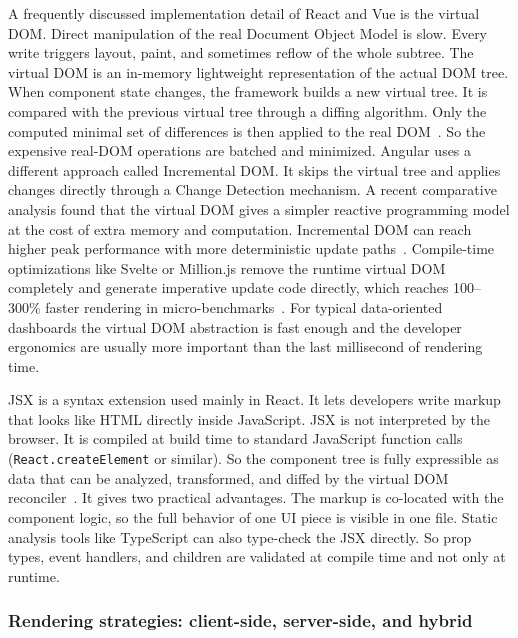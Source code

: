 A frequently discussed implementation detail of React and Vue is the virtual DOM. Direct manipulation of the real Document Object Model is slow. Every write triggers layout, paint, and sometimes reflow of the whole subtree. The virtual DOM is an in-memory lightweight representation of the actual DOM tree. When component state changes, the framework builds a new virtual tree. It is compared with the previous virtual tree through a diffing algorithm. Only the computed minimal set of differences is then applied to the real DOM~\cite{bondarenko2025dom, bai2023million}. So the expensive real-DOM operations are batched and minimized. Angular uses a different approach called Incremental DOM. It skips the virtual tree and applies changes directly through a Change Detection mechanism. A recent comparative analysis found that the virtual DOM gives a simpler reactive programming model at the cost of extra memory and computation. Incremental DOM can reach higher peak performance with more deterministic update paths~\cite{bondarenko2025dom}. Compile-time optimizations like Svelte or Million.js remove the runtime virtual DOM completely and generate imperative update code directly, which reaches 100--300\% faster rendering in micro-benchmarks~\cite{bai2023million, putra2025frontend_comparison}. For typical data-oriented dashboards the virtual DOM abstraction is fast enough and the developer ergonomics are usually more important than the last millisecond of rendering time.

JSX is a syntax extension used mainly in React. It lets developers write markup that looks like HTML directly inside JavaScript. JSX is not interpreted by the browser. It is compiled at build time to standard JavaScript function calls (\texttt{React.createElement} or similar). So the component tree is fully expressible as data that can be analyzed, transformed, and diffed by the virtual DOM reconciler~\cite{goli2019react_hooks}. It gives two practical advantages. The markup is co-located with the component logic, so the full behavior of one UI piece is visible in one file. Static analysis tools like TypeScript can also type-check the JSX directly. So prop types, event handlers, and children are validated at compile time and not only at runtime.

\subsubsection{Rendering strategies: client-side, server-side, and hybrid}
\label{subsec:rendering_strategies}


